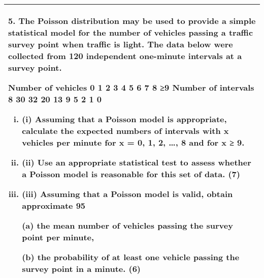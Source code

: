 \documentclass[a4paper,12pt]{article}
\begin{document}
\begin{table}[ht!]
 \centering
 \begin{tabular}{|p{15cm}|}
 \hline  
 \large
5. The Poisson distribution may be used to provide a simple statistical model for the number of vehicles passing a traffic survey point when traffic is light.  The data below were collected from 120 independent one-minute intervals at a survey point. 
 
Number of vehicles 0 1 2 3 4 5 6 7 8 ≥9 
Number of intervals 8 30 32 20 13 9 5 2 1 0 
 
 
 \begin{enumerate}[(i)]
\item (i) Assuming that a Poisson model is appropriate, calculate the expected numbers of intervals with x vehicles per minute for x = 0, 1, 2, …, 8 and for x ≥ 9. %
 
\item (ii) Use an appropriate statistical test to assess whether a Poisson model is reasonable for this set of data. (7) 
 
 \item 
(iii) Assuming that a Poisson model is valid, obtain approximate 95%
 
(a) the mean number of vehicles passing the survey point per minute, 
 
(b) the probability of at least one vehicle passing the survey point in a minute. (6) 

\end{enumerate}

\\ \hline
  \end{tabular}
\end{table}
\end{document}
